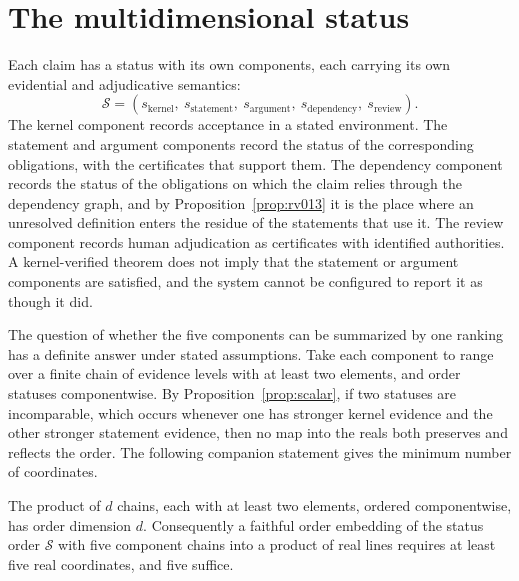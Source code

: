 \section{The multidimensional status}

Each claim has a status with its own components, each carrying its own evidential and adjudicative semantics:
\[
\mathcal{S} = (s_{\mathrm{kernel}},\ s_{\mathrm{statement}},\ s_{\mathrm{argument}},\ s_{\mathrm{dependency}},\ s_{\mathrm{review}}).
\]
The kernel component records acceptance in a stated environment. The statement and argument components record the status of the corresponding obligations, with the certificates that support them. The dependency component records the status of the obligations on which the claim relies through the dependency graph, and by Proposition~\ref{prop:rv013} it is the place where an unresolved definition enters the residue of the statements that use it. The review component records human adjudication as certificates with identified authorities. A kernel-verified theorem does not imply that the statement or argument components are satisfied, and the system cannot be configured to report it as though it did.

The question of whether the five components can be summarized by one ranking has a definite answer under stated assumptions. Take each component to range over a finite chain of evidence levels with at least two elements, and order statuses componentwise. By Proposition~\ref{prop:scalar}, if two statuses are incomparable, which occurs whenever one has stronger kernel evidence and the other stronger statement evidence, then no map into the reals both preserves and reflects the order. The following companion statement gives the minimum number of coordinates.

\begin{proposition}[RV-014, dimension]
\label{prop:dimension}
The product of $d$ chains, each with at least two elements, ordered componentwise, has order dimension $d$. Consequently a faithful order embedding of the status order $\mathcal{S}$ with five component chains into a product of real lines requires at least five real coordinates, and five suffice.
\end{proposition}

